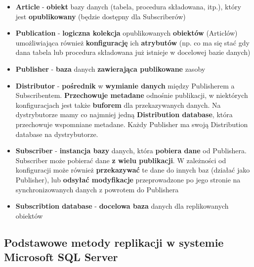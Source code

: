 \documentclass[a4paper]{article}
\begin{document}
    \begin{itemize}
        \item \textbf{Article} - \textbf{obiekt} bazy danych (tabela, procedura składowana, itp.), który jest \textbf{opublikowany} (będzie dostępny dla Subscriberów)
        \item \textbf{Publication} - \textbf{logiczna kolekcja} opublikowanych \textbf{obiektów} (Articlów) umożliwiająca również \textbf{konfigurację} ich \textbf{atrybutów} (np. co ma się stać gdy dana tabela lub procedura składowana już istnieje w docelowej bazie danych)
        \item \textbf{Publisher} - \textbf{baza} danych \textbf{zawierająca publikowane} zasoby
        \item \textbf{Distributor} - \textbf{pośrednik} w \textbf{wymianie danych} między Publisherem a Subscribentem. \textbf{Przechowuje metadane} odnośnie publikacji, w niektórych konfiguracjach jest także \textbf{buforem} dla przekazywanych danych. Na dystrybutorze mamy co najmniej jedną \textbf{Distribution database}, która przechowuje wspomniane metadane. Każdy Publisher ma swoją Distribution database na dystrybutorze.
        \item \textbf{Subscriber} - \textbf{instancja bazy} danych, która \textbf{pobiera dane} od Publishera. Subscriber może pobierać dane \textbf{z wielu publikacji}. W zależności od konfiguracji może również \textbf{przekazywać} te dane do innych baz (działać jako Publisher), lub \textbf{odsyłać modyfikacje} przeprowadzone po jego stronie na synchronizowanych danych z powrotem do Publishera
        \item \textbf{Subscribtion database} - \textbf{docelowa baza} danych dla replikowanych obiektów
    \end{itemize}


    \subsection{Podstawowe metody replikacji w systemie Microsoft SQL Server}
\end{document}
